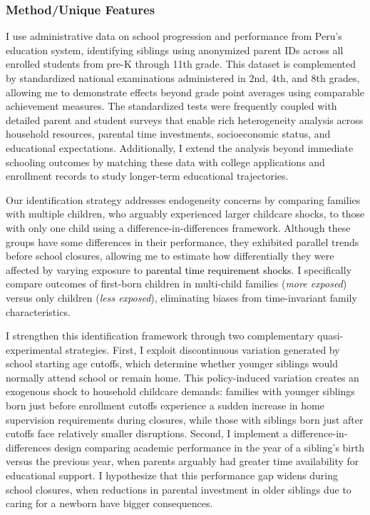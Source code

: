 
\subsubsection{Method/Unique Features}

I use administrative data on school progression and performance from Peru's education system, identifying siblings using anonymized parent IDs across all enrolled students from pre-K through 11th grade. This dataset is complemented by standardized national examinations administered in 2nd, 4th, and 8th grades, allowing me to demonstrate effects beyond grade point averages using comparable achievement measures. The standardized tests were frequently coupled with detailed parent and student surveys that enable rich heterogeneity analysis across household resources, parental time investments, socioeconomic status, and educational expectations. Additionally, I extend the analysis beyond immediate schooling outcomes by matching these data with college applications and enrollment records to study longer-term educational trajectories.

Our identification strategy addresses endogeneity concerns by comparing families with multiple children, who arguably experienced larger childcare shocks, to those with only one child using a difference-in-differences framework. Although these groups have some differences in their performance, they exhibited parallel trends before school closures, allowing me to estimate how differentially they were affected by varying exposure to \textcolor{black}{parental time requirement shocks}. I specifically compare outcomes of first-born children in multi-child families (\textit{more exposed}) versus only children (\textit{less exposed}), eliminating biases from time-invariant family characteristics. 

I strengthen this identification framework through two complementary quasi-experimental strategies. First, I exploit discontinuous variation generated by school starting age cutoffs, which determine whether younger siblings would normally attend school or remain home. This policy-induced variation creates an exogenous shock to household childcare demands: families with younger siblings born just before enrollment cutoffs experience a sudden increase in home supervision requirements during closures, while those with siblings born just after cutoffs face relatively smaller disruptions. Second, I implement a difference-in-differences design comparing academic performance in the year of a sibling's birth versus the previous year, when parents arguably had greater time availability for educational support. I hypothesize that this performance gap widens during school closures, when reductions in parental investment in older siblings due to caring for a newborn have bigger consequences.


